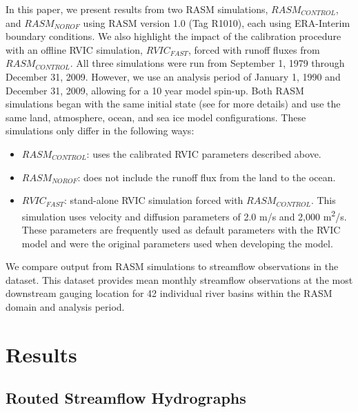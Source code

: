 \documentclass[jgrga, draft]{agutex}
\begin{document}
\begin{article}
In this paper, we present results from two RASM simulations, $RASM_{CONTROL}$, and $RASM_{NOROF}$ using RASM version 1.0 (Tag R1010), each using ERA-Interim boundary conditions.
We also highlight the impact of the calibration procedure with an offline RVIC simulation, $RVIC_{FAST}$, forced with runoff fluxes from $RASM_{CONTROL}$.
All three simulations were run from September 1, 1979 through December 31, 2009. However, we use an analysis period of January 1, 1990 and December 31, 2009, allowing for a 10 year model spin-up.
Both RASM simulations began with the same initial state (see \citet{Hamman_2016} for more details) and use the same land, atmosphere, ocean, and sea ice model configurations.
These simulations only differ in the following ways:
\begin{itemize}
     \item $RASM_{CONTROL}$: uses the calibrated RVIC parameters described above.
     \item $RASM_{NOROF}$: does not include the runoff flux from the land to the ocean.
     \item $RVIC_{FAST}$: stand-alone RVIC simulation forced with $RASM_{CONTROL}$.
          This simulation uses velocity and diffusion parameters of 2.0 m/s and 2,000 m\textsuperscript{2}/s.
          These parameters are frequently used as default parameters with the RVIC model and were the original parameters used when developing the model.
\end{itemize}

We compare output from RASM simulations to streamflow observations in the \citet{Dai_2009} dataset.
This dataset provides mean monthly streamflow observations at the most downstream gauging location for 42 individual river basins within the RASM domain and analysis period.

\section{Results}

\subsection{Routed Streamflow Hydrographs}


\end{article}
\end{document}
